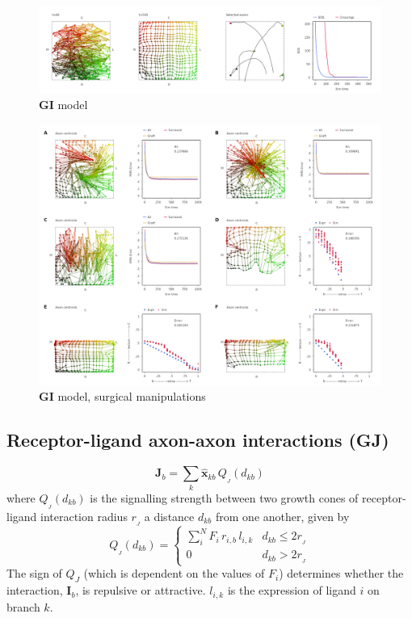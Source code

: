 \documentclass[11pt, a4paper]{article}
\begin{document}
\begin{figure}
\includegraphics[width=\linewidth]{./images/j4_ee_GI_best_1_wt_figcomp2.png}
\caption{$\mathbf{GI}$ model}
\label{f:GI}
\end{figure}

\begin{figure}
\includegraphics[width=\linewidth]{./images/fig_GI_surgical.png}
\caption{$\mathbf{GI}$ model, surgical manipulations}
\label{f:GI}
\end{figure}

\subsection*{Receptor-ligand axon-axon interactions (GJ)}

%
\begin{equation}
\mathbf{J}_b = \sum_k \hat{\mathbf{x}}_{kb}\,Q_{\!_J}(d_{kb})
\end{equation}
%
where $Q_{\!_J}(d_{kb})$ is the signalling strength between two growth cones of
receptor-ligand interaction radius $r_{\!_J}$ a distance $d_{kb}$ from one another,
given by
%
\begin{equation}
Q_{\!_J}(d_{kb}) = \begin{cases}
     \sum_i^N F_i\,r_{i,b}\,l_{i,k}    & d_{kb} \leq 2r_{\!_J} \\
     0 & d_{kb} > 2r_{\!_J}
     \end{cases}
\end{equation}
%
The sign of $Q_J$ (which is dependent on the values of $F_i$) determines whether
the interaction, $\mathbf{I}_b$, is repulsive or attractive. $l_{i,k}$ is the
expression of ligand $i$ on branch $k$.
\end{document}
